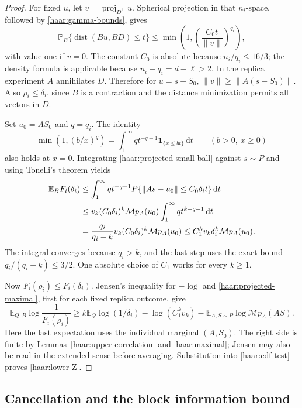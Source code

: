 \begin{proof}
For fixed $u$, let $v=\operatorname{proj}_{D^\perp}u$.  Spherical
projection in that $n_i$-space, followed by
\eqref{haar:gamma-bounds}, gives
\begin{equation}\label{haar:projected-small-ball}
 \mathbb P_B\{\operatorname{dist}(Bu,BD)\le t\}
 \le\min\left(1,\left(\frac{C_0t}{\lVert v\rVert}\right)^{q_i}\right),
\end{equation}
with value one if $v=0$.  The constant $C_0$ is absolute because
$n_i/q_i\le16/3$; the density formula is applicable because
$n_i-q_i=d-\ell>2$.  In the replica experiment $A$ annihilates $D$.
Therefore for $u=s-S_0$,
$\lVert v\rVert\ge\lVert A(s-S_0)\rVert$.  Also
$\rho_i\le\delta_i$, since $B$ is a contraction and the distance
minimization permits all vectors in $D$.

Set $u_0=AS_0$ and $q=q_i$.  The identity
\[
 \min(1,(b/x)^q)=\int_1^\infty qt^{-q-1}
                 \mathbf 1_{\{x\le bt\}}\,\mathrm dt
       \qquad(b>0,\ x\ge0)
\]
also holds at $x=0$.  Integrating \eqref{haar:projected-small-ball}
against $s\sim P$ and using Tonelli's theorem yields
\begin{align}
 \mathbb E_B F_i(\delta_i)
 &\le\int_1^\infty qt^{-q-1}
       P\{\lVert As-u_0\rVert\le C_0\delta_i t\}\,\mathrm dt\notag\\
 &\le v_k(C_0\delta_i)^k\mathcal M p_A(u_0)
             \int_1^\infty qt^{k-q-1}\,\mathrm dt\notag\\
 &=\frac{q_i}{q_i-k}v_k(C_0\delta_i)^k\mathcal M p_A(u_0)
 \le C_1^kv_k\delta_i^k\mathcal M p_A(u_0).
 \label{haar:projected-maximal}
\end{align}
The integral converges because $q_i>k$, and the last step uses the exact
bound $q_i/(q_i-k)\le3/2$.  One absolute choice of $C_1$ works for every
$k\ge1$.

Now $F_i(\rho_i)\le F_i(\delta_i)$.  Jensen's inequality for $-\log$
and \eqref{haar:projected-maximal}, first for each fixed replica outcome,
give
\[
 \mathbb E_{Q,B}\log\frac1{F_i(\rho_i)}
 \ge k\mathbb E_Q\log(1/\delta_i)-\log(C_1^kv_k)
       -\mathbb E_{A,S\sim P}\log\mathcal M p_A(AS).
\]
Here the last expectation uses the individual marginal $(A,S_0)$.
The right side is finite by Lemmas~\ref{haar:upper-correlation} and
\ref{haar:maximal}; Jensen may also be read in the extended sense before
averaging.  Substitution into \eqref{haar:cdf-test} proves
\eqref{haar:lower-Z}.
\end{proof}

\subsection{Cancellation and the block information bound}

